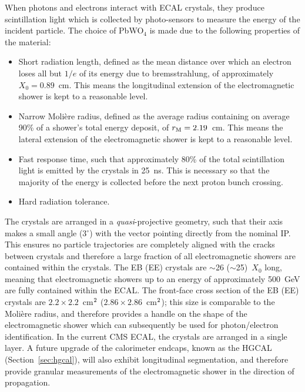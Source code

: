 When photons and electrons interact with ECAL crystals, they produce scintillation light which is collected by photo-sensors to measure the energy of the incident particle. The choice of PbWO$_4$ is made due to the following properties of the material:
\begin{itemize}
    \item Short radiation length, defined as the mean distance over which an electron loses all but $1/e$ of its energy due to bremsstrahlung, of approximately $X_0=0.89$~cm. This means the longitudinal extension of the electromagnetic shower is kept to a reasonable level.
    \item Narrow Moli\`ere radius, defined as the average radius containing on average 90\% of a shower's total energy deposit, of $r_{\rm{M}}=2.19$~cm. This means the lateral extension of the electromagnetic shower is kept to a reasonable level.
    \item Fast response time, such that approximately 80\% of the total scintillation light is emitted by the crystals in  25~ns. This is necessary so that the majority of the energy is collected before the next proton bunch crossing.
    \item Hard radiation tolerance.
\end{itemize}
The crystals are arranged in a \textit{quasi}-projective geometry, such that their axis makes a small angle (3$^\circ$) with the vector pointing directly from the nominal IP. This ensures no particle trajectories are completely aligned with the cracks between crystals and therefore a large fraction of all electromagnetic showers are contained within the crystals. The EB (EE) crystals are $\sim$26 ($\sim$25)~$X_0$ long, meaning that electromagnetic showers up to an energy of approximately 500~GeV are fully contained within the ECAL. The front-face cross section of the EB (EE) crystals are $2.2\times2.2$~cm$^{\rm{2}}$ ($2.86\times2.86$~cm$^{\rm{2}}$); this size is comparable to the Moli\`ere radius, and therefore provides a handle on the shape of the electromagnetic shower which can subsequently be used for photon/electron identification. In the current CMS ECAL, the crystals are arranged in a single layer. A future upgrade of the calorimeter endcaps, known as the HGCAL (Section~\ref{sec:hgcal}), will also exhibit longitudinal segmentation, and therefore provide granular measurements of the electromagnetic shower in the direction of propagation.

